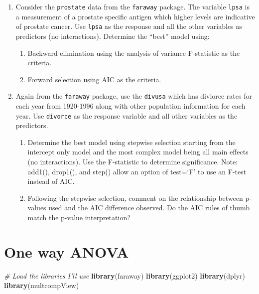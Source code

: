 \documentclass[]{book}
\newenvironment{Shaded}{\begin{snugshade}}{\end{snugshade}}
\newcommand{\KeywordTok}[1]{\textcolor[rgb]{0.13,0.29,0.53}{\textbf{{#1}}}}
\newcommand{\CommentTok}[1]{\textcolor[rgb]{0.56,0.35,0.01}{\textit{{#1}}}}
\newcommand{\NormalTok}[1]{{#1}}
\theoremstyle{definition}
\theoremstyle{definition}
\theoremstyle{remark}
\begin{document}
\begin{enumerate}
\def\labelenumi{\arabic{enumi}.}
\item
  Consider the \texttt{prostate} data from the \texttt{faraway} package.
  The variable \texttt{lpsa} is a measurement of a prostate specific
  antigen which higher levels are indicative of prostate cancer. Use
  \texttt{lpsa} as the response and all the other variables as
  predictors (no interactions). Determine the ``best'' model using:

  \begin{enumerate}
  \def\labelenumii{\alph{enumii}.}
  \item
    Backward elimination using the analysis of variance F-statistic as
    the criteria.
  \item
    Forward selection using AIC as the criteria.
  \end{enumerate}
\item
  Again from the \texttt{faraway} package, use the \texttt{divusa} which
  has diviorce rates for each year from 1920-1996 along with other
  population information for each year. Use \texttt{divorce} as the
  response variable and all other variables as the predictors.

  \begin{enumerate}
  \def\labelenumii{\alph{enumii}.}
  \item
    Determine the best model using stepwise selection starting from the
    intercept only model and the most complex model being all main
    effects (no interactions). Use the F-statistic to determine
    significance. Note: add1(), drop1(), and step() allow an option of
    test=`F' to use an F-test instead of AIC.
  \item
    Following the stepwise selection, comment on the relationship
    between p-values used and the AIC difference observed. Do the AIC
    rules of thumb match the p-value interpretation?
  \end{enumerate}
\end{enumerate}

\chapter{One way ANOVA}\label{one-way-anova}

\begin{Shaded}
\begin{Highlighting}[]
\CommentTok{# Load the libraries I'll use}
\KeywordTok{library}\NormalTok{(faraway)}
\KeywordTok{library}\NormalTok{(ggplot2)}
\KeywordTok{library}\NormalTok{(dplyr)}
\KeywordTok{library}\NormalTok{(multcompView)}
\end{Highlighting}
\end{Shaded}
\end{document}
